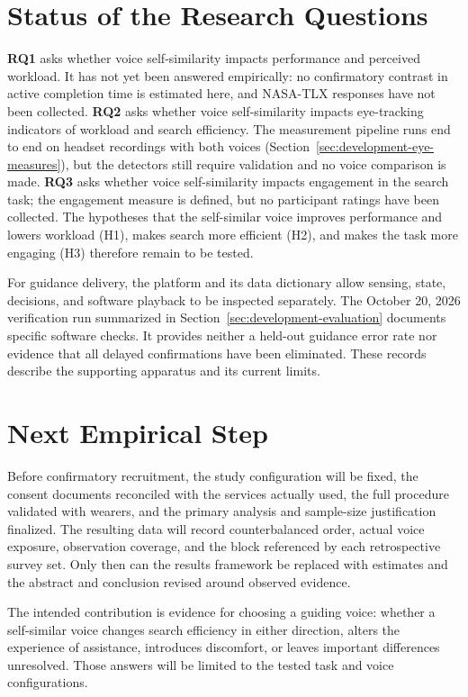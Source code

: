 \section{Status of the Research Questions}
\textbf{RQ1} asks whether voice self-similarity impacts performance and perceived workload. It has not yet been answered empirically: no confirmatory contrast in active completion time is estimated here, and NASA-TLX responses have not been collected. \textbf{RQ2} asks whether voice self-similarity impacts eye-tracking indicators of workload and search efficiency. The measurement pipeline runs end to end on headset recordings with both voices (Section~\ref{sec:development-eye-measures}), but the detectors still require validation and no voice comparison is made. \textbf{RQ3} asks whether voice self-similarity impacts engagement in the search task; the engagement measure is defined, but no participant ratings have been collected. The hypotheses that the self-similar voice improves performance and lowers workload (H1), makes search more efficient (H2), and makes the task more engaging (H3) therefore remain to be tested.

For guidance delivery, the platform and its data dictionary allow sensing, state, decisions, and software playback to be inspected separately. The October 20, 2026 verification run summarized in Section~\ref{sec:development-evaluation} documents specific software checks. It provides neither a held-out guidance error rate nor evidence that all delayed confirmations have been eliminated. These records describe the supporting apparatus and its current limits.

\section{Next Empirical Step}
Before confirmatory recruitment, the study configuration will be fixed, the consent documents reconciled with the services actually used, the full procedure validated with wearers, and the primary analysis and sample-size justification finalized. The resulting data will record counterbalanced order, actual voice exposure, observation coverage, and the block referenced by each retrospective survey set. Only then can the results framework be replaced with estimates and the abstract and conclusion revised around observed evidence.

The intended contribution is evidence for choosing a guiding voice: whether a self-similar voice changes search efficiency in either direction, alters the experience of assistance, introduces discomfort, or leaves important differences unresolved. Those answers will be limited to the tested task and voice configurations.
